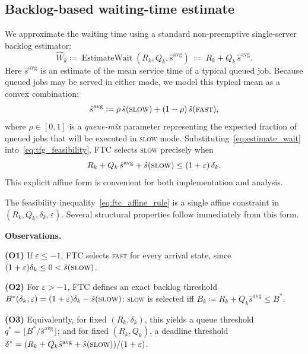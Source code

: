 \documentclass[fleqn,12pt,lineno]{wlpeerj}
\begin{document}
\subsection{Backlog-based waiting-time estimate}
\label{sec:tfg_wait_est}

We approximate the waiting time using a standard non-preemptive single-server backlog estimator:
\begin{equation}
\widehat{W}_k \coloneqq \operatorname{EstimateWait}(R_k,Q_k,\hat{s}^{\mathrm{avg}})
\ \coloneqq\ R_k + Q_k\,\hat{s}^{\mathrm{avg}}.
\label{eq:estimate_wait}
\end{equation}
Here $\hat{s}^{\mathrm{avg}}$ is an estimate of the mean service time of a typical queued job. Because queued jobs may be served in either mode, we model this typical mean as a convex combination:
\begin{equation}
\hat{s}^{\mathrm{avg}} \coloneqq \rho\,\hat{s}(\textsc{slow}) + (1-\rho)\,\hat{s}(\textsc{fast}),
\label{eq:avg_service_mix}
\end{equation}
where $\rho\in[0,1]$ is a \emph{queue-mix} parameter representing the expected fraction of queued jobs that will be executed in \textsc{slow} mode. Substituting~\eqref{eq:estimate_wait} into~\eqref{eq:tfg_feasibility}, FTC selects \textsc{slow} precisely when
\begin{equation}
R_k + Q_k\,\hat{s}^{\mathrm{avg}} + \hat{s}(\textsc{slow}) \le (1+\varepsilon)\,\delta_k.
\label{eq:ftc_affine_rule}
\end{equation}
This explicit affine form is convenient for both implementation and analysis.

The feasibility inequality~\eqref{eq:ftc_affine_rule} is a single affine constraint in $(R_k, Q_k, \delta_k, \varepsilon)$. Several structural properties follow immediately from this form.

\noindent\textbf{Observations.}

\noindent\textbf{(O1)} If $\varepsilon \le -1$, FTC selects \textsc{fast} for every arrival state, since $(1+\varepsilon)\delta_k \le 0 < \hat{s}(\textsc{slow})$.

\noindent\textbf{(O2)} For $\varepsilon > -1$, FTC defines an exact backlog threshold $B^{\ast}(\delta_k,\varepsilon) = (1+\varepsilon)\delta_k - \hat{s}(\textsc{slow})$: \textsc{slow} is selected iff $B_k \coloneqq R_k + Q_k \hat{s}^{\mathrm{avg}} \le B^{\ast}$.

\noindent\textbf{(O3)} Equivalently, for fixed $(R_k, \delta_k)$, this yields a queue threshold $q^{\ast} = \lfloor B^{\ast}/\hat{s}^{\mathrm{avg}} \rfloor$; and for fixed $(R_k, Q_k)$, a deadline threshold $\delta^{\ast} = (R_k + Q_k \hat{s}^{\mathrm{avg}} + \hat{s}(\textsc{slow}))/(1+\varepsilon)$.
\end{document}
